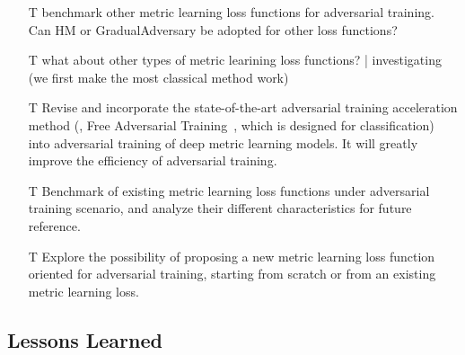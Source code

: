 \begin{itemize}
	\item [T] benchmark other metric learning loss functions for adversarial
		training. Can HM or GradualAdversary be adopted for other loss functions?

	\item [T]  what about other types of metric learining loss functions? |
		investigating (we first make the most classical method work)

	\item [T] Revise and incorporate the state-of-the-art adversarial training
		acceleration method (\ie, Free Adversarial Training~\cite{freeat},
		which is designed for classification) into adversarial training of 
		deep metric learning models. It will greatly improve the efficiency
		of adversarial training.
	\item [T] Benchmark of existing metric learning loss functions under
		adversarial training scenario, and analyze their different
		characteristics for future reference.
	\item [T] Explore the possibility of proposing a new metric learning loss
		function oriented for adversarial training, starting from scratch or
		from an existing metric learning loss.
\end{itemize}

\subsection{Lessons Learned}



